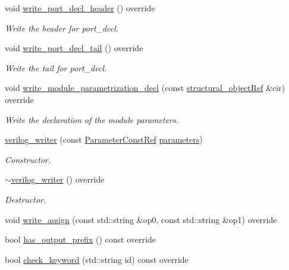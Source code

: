 \begin{DoxyCompactItemize}
void \hyperlink{classverilog__writer_a326f7f3aadac6d88b989a477360feb47}{write\+\_\+port\+\_\+decl\+\_\+header} () override
\begin{DoxyCompactList}\small\item\em Write the header for port\+\_\+decl. \end{DoxyCompactList}\item 
void \hyperlink{classverilog__writer_adb76a5b50df9958409d5bde95d2dae79}{write\+\_\+port\+\_\+decl\+\_\+tail} () override
\begin{DoxyCompactList}\small\item\em Write the tail for port\+\_\+decl. \end{DoxyCompactList}\item 
void \hyperlink{classverilog__writer_a429d09829b565c8bb4b243b0eb089546}{write\+\_\+module\+\_\+parametrization\+\_\+decl} (const \hyperlink{structural__objects_8hpp_a8ea5f8cc50ab8f4c31e2751074ff60b2}{structural\+\_\+object\+Ref} \&cir) override
\begin{DoxyCompactList}\small\item\em Write the declaration of the module parameters. \end{DoxyCompactList}\item 
\hyperlink{classverilog__writer_aa53cae880dfdd2adb20a47887f8a2a70}{verilog\+\_\+writer} (const \hyperlink{Parameter_8hpp_a37841774a6fcb479b597fdf8955eb4ea}{Parameter\+Const\+Ref} \hyperlink{classlanguage__writer_aeb717c1d12571e3808759009be752d59}{parameters})
\begin{DoxyCompactList}\small\item\em Constructor. \end{DoxyCompactList}\item 
\hyperlink{classverilog__writer_ac301c11a82d8f9e788332550df4271f7}{$\sim$verilog\+\_\+writer} () override
\begin{DoxyCompactList}\small\item\em Destructor. \end{DoxyCompactList}\item 
void \hyperlink{classverilog__writer_a67bc3c89705a8863735409e64aa8cf32}{write\+\_\+assign} (const std\+::string \&op0, const std\+::string \&op1) override
\item 
bool \hyperlink{classverilog__writer_a33625c1b43ea1ee1fa7331cde5d83c8b}{has\+\_\+output\+\_\+prefix} () const override
\item 
bool \hyperlink{classverilog__writer_a1595f62191efb28fa23d944791bbdd71}{check\+\_\+keyword} (std\+::string id) const override

\end{DoxyCompactItemize}
